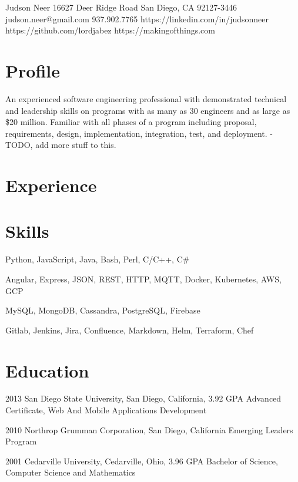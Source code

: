 \documentclass{article}
\begin{document}
\header
  {Judson Neer}
  {16627 Deer Ridge Road}
  {San Diego, CA 92127-3446}
  {judson.neer@gmail.com}
  {937.902.7765}
  {https://linkedin.com/in/judsonneer}
  {https://github.com/lordjabez}
  {https://makingofthings.com}


\section{Profile}

An experienced software engineering professional with demonstrated technical and leadership skills on programs with as many as 30 engineers and as large as \$20 million. Familiar with all phases of a program including proposal, requirements, design, implementation, integration, test, and deployment. - TODO, add more stuff to this.


\section{Experience}



\section{Skills}

  {Python, JavaScript, Java, Bash, Perl, C/C++, C\#}

  {Angular, Express, JSON, REST, HTTP, MQTT, Docker, Kubernetes, AWS, GCP}

  {MySQL, MongoDB, Cassandra, PostgreSQL, Firebase}

  {Gitlab, Jenkins, Jira, Confluence, Markdown, Helm, Terraform, Chef}


\section{Education}

\education
  {2013}
  {San Diego State University, San Diego, California, 3.92 GPA}
  {Advanced Certificate, Web And Mobile Applications Development}

\education
  {2010}
  {Northrop Grumman Corporation, San Diego, California}
  {Emerging Leaders Program}

\education
  {2001}
  {Cedarville University, Cedarville, Ohio, 3.96 GPA}
  {Bachelor of Science, Computer Science and Mathematics}


\end{document}
